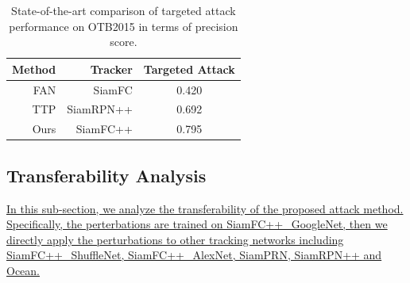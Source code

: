 \documentclass[journal]{IEEEtran}
\begin{document}
\begin{table}[t]
  \centering
  \caption{State-of-the-art comparison of targeted attack performance on OTB2015 in terms of precision score.}
  \begin{tabular}{@{}rrc@{}}
  \toprule
  Method & Tracker &  Targeted Attack \\
  \midrule
  FAN & SiamFC  &0.420 \\
  TTP & SiamRPN++ &0.692 \\
  \midrule
  Ours & SiamFC++  &0.795 \\ \bottomrule
  \end{tabular}
  \label{tab:SOTA1}
\end{table}

\subsection{Transferability Analysis}

\uline{In this sub-section, we analyze the transferability of the proposed attack method. Specifically, the perterbations are trained on SiamFC++\_GoogleNet, then we directly apply the perturbations to other tracking networks including SiamFC++\_ShuffleNet, SiamFC++\_AlexNet, SiamPRN, SiamRPN++ and Ocean.}
\end{document}
